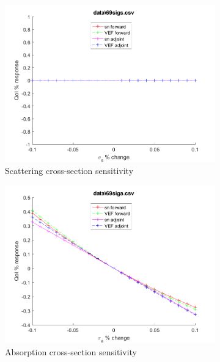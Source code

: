 \documentclass{article}
\begin{document}
\begin{figure}[H]
\begin{subfigure}{.5\textwidth}
  \includegraphics[width=.98\linewidth]{IanProposal/figures2/69sigsSens.png}
  \caption{Scattering cross-section sensitivity}
  \label{fig:sfig2}
\end{subfigure}%
\begin{subfigure}{.5\textwidth}
  \centering
  \includegraphics[width=.98\linewidth]{IanProposal/figures2/69sigaSens.png}
  \caption{Absorption cross-section sensitivity}
  \label{fig:sfig5}
\end{subfigure}%
\caption{}
\label{fig:fig}
\end{figure}
\newpage

\end{document}

